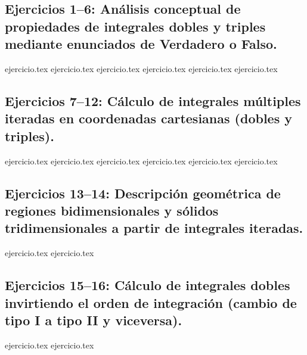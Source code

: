
\subsection*{Ejercicios 1--6: Análisis conceptual de propiedades de integrales dobles y triples mediante enunciados de Verdadero o Falso.}
\begin{enumerate}
    {ejercicio.tex}
    {ejercicio.tex}
    {ejercicio.tex}
    {ejercicio.tex}
    {ejercicio.tex}
    {ejercicio.tex}
\end{enumerate}

\subsection*{Ejercicios 7--12: Cálculo de integrales múltiples iteradas en coordenadas cartesianas (dobles y triples).}
\begin{enumerate}
    \setcounter{enumi}{6}
    {ejercicio.tex}
    {ejercicio.tex}
    {ejercicio.tex}
    {ejercicio.tex}
    {ejercicio.tex}
    {ejercicio.tex}
\end{enumerate}

\subsection*{Ejercicios 13--14: Descripción geométrica de regiones bidimensionales y sólidos tridimensionales a partir de integrales iteradas.}
\begin{enumerate}
    \setcounter{enumi}{12}
    {ejercicio.tex}
    {ejercicio.tex}
\end{enumerate}

\subsection*{Ejercicios 15--16: Cálculo de integrales dobles invirtiendo el orden de integración (cambio de tipo I a tipo II y viceversa).}
\begin{enumerate}
    \setcounter{enumi}{14}
    {ejercicio.tex}
    {ejercicio.tex}
\end{enumerate}


